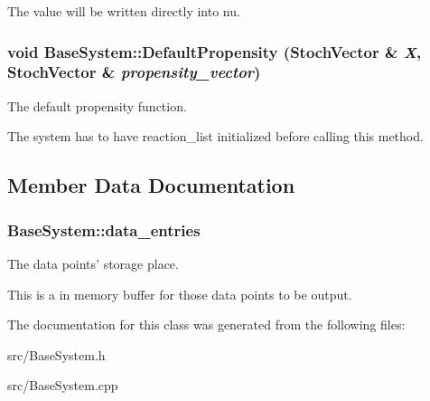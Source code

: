 The value will be written directly into nu. \hypertarget{class_base_system_5ab5b42237240093f9b3c717ae930c55}{
\subsubsection{\setlength{\rightskip}{0pt plus 5cm}void BaseSystem::DefaultPropensity ({\bf StochVector} \& {\em X}, \/  {\bf StochVector} \& {\em propensity\_\-vector})}}
\label{class_base_system_5ab5b42237240093f9b3c717ae930c55}


The default propensity function. 

The system has to have reaction\_\-list initialized before calling this method. 

\subsection{Member Data Documentation}
\hypertarget{class_base_system_103c282753d79d2c176feb36ee4fcc2f}{
\subsubsection{ {\bf BaseSystem::data\_\-entries}}}
\label{class_base_system_103c282753d79d2c176feb36ee4fcc2f}


The data points' storage place. 

This is a in memory buffer for those data points to be output. 

The documentation for this class was generated from the following files:\begin{CompactItemize}
\item 
src/BaseSystem.h\item 
src/BaseSystem.cpp\end{CompactItemize}
